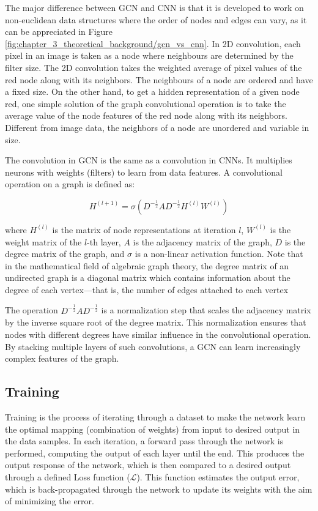 The major difference between GCN and CNN is that it is developed to work on non-euclidean data structures where the order of nodes and edges can vary, as it can be appreciated in Figure \ref{fig:chapter_3_theoretical_background/gcn_vs_cnn}. In 2D convolution, each pixel in an image is taken as a node where neighbours are determined by the filter size. The 2D convolution takes the weighted average of pixel values of the red node along with its neighbors. The neighbours of a node are ordered and have a fixed size. On the other hand, to get a hidden representation of a given node red, one simple solution of the graph convolutional operation is to take the average value of the node features of the red node along with its neighbors. Different from image data, the neighbors of a node are unordered and variable in size.

The convolution in GCN is the same as a convolution in \acp{CNN}. It multiplies neurons with weights (filters) to learn from data features. A convolutional operation on a graph is defined as:

\begin{equation}
H^{(l+1)} = \sigma(D^{-\frac{1}{2}} A D^{-\frac{1}{2}} H^{(l)} W^{(l)})
\end{equation}

where $H^{(l)}$ is the matrix of node representations at iteration $l$, $W^{(l)}$ is the weight matrix of the $l$-th layer, $A$ is the adjacency matrix of the graph, $D$ is the degree matrix of the graph, and $\sigma$ is a non-linear activation function. Note that in the mathematical field of algebraic graph theory, the degree matrix of an undirected graph is a diagonal matrix which contains information about the degree of each vertex—that is, the number of edges attached to each vertex

The operation $D^{-\frac{1}{2}} A D^{-\frac{1}{2}}$ is a normalization step that scales the adjacency matrix by the inverse square root of the degree matrix. This normalization ensures that nodes with different degrees have similar influence in the convolutional operation. By stacking multiple layers of such convolutions, a GCN can learn increasingly complex features of the graph.

\subsection{Training}
\label{subsec:3_training}

Training is the process of iterating through a dataset to make the network learn the optimal mapping (combination of weights) from input to desired output in the data samples. In each iteration, a forward pass through the network is performed, computing the output of each layer until the end. This produces the output response of the network, which is then compared to a desired output through a defined Loss function ($\mathcal{L}$). This function estimates the output error, which is back-propagated through the network to update its weights with the aim of minimizing the error. 

